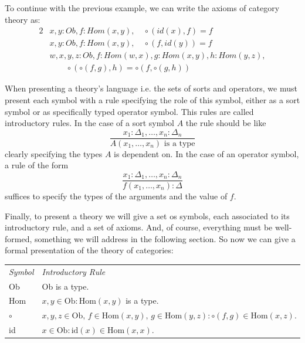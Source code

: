 To continue with the previous example, we can write the axioms
of category theory as:
\begin{alignat*}{2}
    &x, y : Ob, f : Hom(x, y),  \quad  \circ(id(x), f) = f \\
    &x, y : Ob, f : Hom(x, y),  \quad  \circ(f, id(y)) = f \\
    &w, x, y, z : Ob, f : Hom(w, x), g : Hom(x, y), h : Hom(y, z), \\ &\qquad\circ(\circ(f, g), h) = \circ(f, \circ(g, h))
\end{alignat*}

When presenting a theory's language i.e. the sets of sorts and operators,
we must present each symbol with a rule specifying the role
of this symbol, either as a sort symbol or as specifically typed operator symbol. 
This rules are called introductory rules.
In the case of a sort symbol $A$ the rule should be like 
\begin{equation*}
    \dfrac{
        x_1 : \Delta_1, \dots, x_n : \Delta_n
    }{
        A(x_1, \dots, x_n) \text{ is a type}
    }
\end{equation*}
clearly specifying the types $A$ is dependent on.
In the case of an operator symbol, a rule of the form
\begin{equation*}
    \dfrac{
        x_1 : \Delta_1, \dots, x_n : \Delta_n
    }{
        f(x_1, \dots, x_n) : \Delta
    }
\end{equation*}
suffices to specify the types of the arguments and the value of $f$.

Finally, to present a theory we will give a set os symbols,
each associated to its introductory rule, and a set of axioms.
And, of course, everything must be well-formed, {\color{orange} something we 
will address in the following section.}
So now we can give a formal presentation of the theory of categories:

\begin{tabular}{ll}
\textit{Symbol} & \textit{Introductory Rule} \\[6pt]
Ob  & Ob is a type. \\[4pt]
Hom & $x, y \in \mathrm{Ob} : \mathrm{Hom}(x, y)$ is a type. \\[4pt]
$\circ$ & $x, y, z \in \mathrm{Ob},\, f \in \mathrm{Hom}(x, y),\, g \in \mathrm{Hom}(y, z) : \circ(f, g) \in \mathrm{Hom}(x, z).$ \\[4pt]
id  & $x \in \mathrm{Ob} : \mathrm{id}(x) \in \mathrm{Hom}(x, x).$ \\
\end{tabular}

